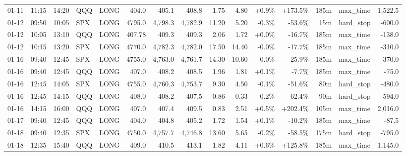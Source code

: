 \documentclass[11pt,a4paper,twoside]{article}
\begin{document}
\begin{landscape}
\begin{center}
\begin{longtable}{>{\color{txtmain}}l l l l l r r r r r r r r >{\color{txtmain}}l r}
01-11 & 11:15 & 14:20 & QQQ & LONG & 404.0 & 405.1 & 408.8 & 1.75 & 4.80 & \textcolor{wingreen}{+0.9\%} & \textcolor{wingreen}{+173.5\%} & 185m & max\_time & \textcolor{wingreen}{1,522.5} \\
01-12 & 09:50 & 10:05 & SPX & LONG & 4795.0 & 4,798.3 & 4,782.9 & 11.20 & 5.20 & \textcolor{lossred}{-0.3\%} & \textcolor{lossred}{-53.6\%} & 15m & hard\_stop & \textcolor{lossred}{-600.0} \\
01-12 & 10:05 & 13:10 & QQQ & LONG & 407.78 & 409.3 & 409.3 & 2.06 & 1.72 & \textcolor{wingreen}{+0.0\%} & \textcolor{lossred}{-16.7\%} & 185m & max\_time & \textcolor{lossred}{-138.0} \\
01-12 & 10:15 & 13:20 & SPX & LONG & 4770.0 & 4,782.3 & 4,782.0 & 17.50 & 14.40 & \textcolor{lossred}{-0.0\%} & \textcolor{lossred}{-17.7\%} & 185m & max\_time & \textcolor{lossred}{-310.0} \\
01-16 & 09:40 & 12:45 & SPX & LONG & 4755.0 & 4,763.0 & 4,761.7 & 14.30 & 10.60 & \textcolor{lossred}{-0.0\%} & \textcolor{lossred}{-25.9\%} & 185m & max\_time & \textcolor{lossred}{-370.0} \\
01-16 & 09:40 & 12:45 & QQQ & LONG & 407.0 & 408.2 & 408.5 & 1.96 & 1.81 & \textcolor{wingreen}{+0.1\%} & \textcolor{lossred}{-7.7\%} & 185m & max\_time & \textcolor{lossred}{-75.0} \\
01-16 & 12:45 & 14:05 & SPX & LONG & 4755.0 & 4,760.3 & 4,753.7 & 9.30 & 4.50 & \textcolor{lossred}{-0.1\%} & \textcolor{lossred}{-51.6\%} & 80m & hard\_stop & \textcolor{lossred}{-480.0} \\
01-16 & 12:45 & 14:15 & QQQ & LONG & 408.0 & 408.2 & 407.5 & 0.86 & 0.33 & \textcolor{lossred}{-0.2\%} & \textcolor{lossred}{-62.4\%} & 90m & hard\_stop & \textcolor{lossred}{-594.0} \\
01-16 & 14:15 & 16:00 & QQQ & LONG & 407.0 & 407.4 & 409.5 & 0.83 & 2.51 & \textcolor{wingreen}{+0.5\%} & \textcolor{wingreen}{+202.4\%} & 105m & max\_time & \textcolor{wingreen}{2,016.0} \\
01-17 & 09:40 & 12:45 & QQQ & LONG & 404.0 & 404.8 & 405.2 & 1.72 & 1.54 & \textcolor{wingreen}{+0.1\%} & \textcolor{lossred}{-10.2\%} & 185m & max\_time & \textcolor{lossred}{-87.5} \\
01-18 & 09:40 & 12:35 & SPX & LONG & 4750.0 & 4,757.7 & 4,746.8 & 13.60 & 5.65 & \textcolor{lossred}{-0.2\%} & \textcolor{lossred}{-58.5\%} & 175m & hard\_stop & \textcolor{lossred}{-795.0} \\
01-18 & 12:35 & 15:40 & QQQ & LONG & 409.0 & 410.5 & 413.1 & 1.82 & 4.11 & \textcolor{wingreen}{+0.6\%} & \textcolor{wingreen}{+125.8\%} & 185m & max\_time & \textcolor{wingreen}{1,145.0} \\

\end{longtable}
\end{center}
\end{landscape}
\end{document}
